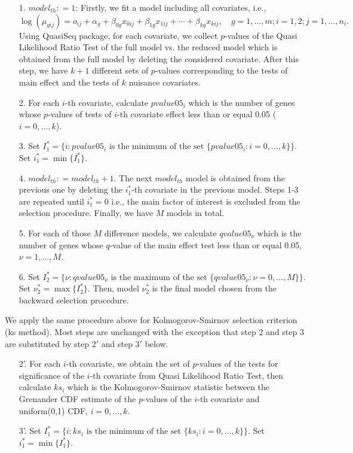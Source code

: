 \documentclass[12pt, letter]{article}\usepackage[]{graphicx}\usepackage[]{color}
\begin{document}
\begin{itemize}
\item[1.] $model_{th}: =1$: Firstly, we fit a model including all covariates, i.e.,
\[
\log(\mu_{gij}) = o_{ij} +\alpha_{g} +  \beta_{0g}x_{0ij} + \beta_{1g}x_{1ij} + \cdots + \beta_{kg}x_{kij}, \quad g = 1, \dots, m; i = 1, 2; j = 1, \dots, n_i.
\]
Using QuasiSeq package, for each covariate, we collect $p$-values of the Quasi Likelihood Ratio Test of the full model vs. the reduced model which is obtained from the full model by deleting the considered covariate. After this step, we have $k+1$ different sets of $p$-values corresponding to the tests of main effect and the tests of $k$ nuisance covariates. 

\item[2.] For each $i$-th  covariate, calculate $pvalue05_i$ which is the number of genes whose $p$-values of tests of $i$-th covariate effect less than or equal 0.05 ($i = 0,\dots, k$). 

\item[3.] Set $I_1^* = \{i: pvalue05_i \mbox{ is the minimum of the set }\{pvalue05_i: i = 0, \dots, k\}\}$. Set $i_1^* = \min\{I_1^*\}$. 

\item[4.] $model_{th}: = model_{th} +1$. The next $model_{th}$ model is obtained from the previous one by deleting the $i_1^*$-th covariate in the previous model. Steps 1-3 are repeated  until $i_1^* = 0$ i.e., the main factor of interest is excluded from the selection procedure. Finally, we have $M$ models in total.

\item[5.] For each of those $M$ difference models, we calculate $qvalue05_\nu$ which is the number of genes whose $q$-value of the main effect test less than or equal 0.05, $ \nu = 1, \dots, M$. 

\item[6.]  Set $I_2^* = \{\nu: qvalue05_\nu \mbox{ is the maximum of the set }\{qvalue05_\nu: \nu = 0, \dots, M\}\}$. Set $\nu_2^* = \max\{I_2^*\}$. Then, model $\nu_2^*$ is the final model chosen from the backward selection procedure. 
\end{itemize}

We apply the same procedure  above for Kolmogorov-Smirnov selection criterion (ks method). Most steps  are unchanged with the exception that step 2 and step 3 are substituted by step $2'$ and step $3'$ below.
\begin{itemize}
\item[2'.] For each $i$-th covariate, we obtain the set of $p$-values of the tests for significance of the $i$-th covariate from Quasi Likelihood Ratio Test, then calculate $ks_i$ which is the Kolmogorov-Smirnov statistic between the Grenander CDF estimate of the $p$-values of the $i$-th covariate
and uniform(0,1) CDF, $ i = 0, \dots, k$. 

\item[3'.] Set $I_1^* = \{i: ks_i \mbox{ is the minimum of the set }\{ks_i: i = 0, \dots, k\}\}$. Set $i_1^* = \min\{I_1^*\}$. 
\end{itemize}
\end{document}
